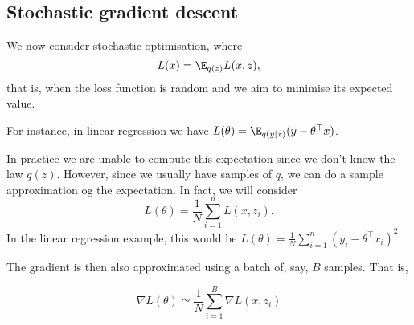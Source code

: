 \subsection{Stochastic gradient descent}
\label{sub:SGD}


We now consider stochastic optimisation, where
\begin{equation}
	L(x) = \E_{q(z)}L(x,z),
\end{equation}
that is, when the loss function is random and we aim to minimise its expected value. 

For instance, in linear regression we have $L(\theta)=\E_{q(y|x)}(y-\theta^\top x)$.

In practice we are unable to compute this expectation since we don't know the law $q(z)$. However, since we usually have samples of $q$, we can do a sample approximation og the expectation. In fact, we will consider
\begin{equation}
	L(\theta) = \frac{1}{N}\sum_{i=1}^nL(x,z_i).
\end{equation}
In the linear regression example, this would be $L(\theta) = \frac{1}{N}\sum_{i=1}^n(y_i-\theta^\top x_i)^2.$ 

The gradient is then also approximated using a batch of, say, $B$ samples. That is, 

\begin{equation}
	\nabla L(\theta)\simeq \frac{1}{N}\sum_{i=1}^B\nabla L(x,z_i)
\end{equation}

\begin{mdframed}[style=ejemplo, frametitle={\center Example: random loss function for linear regression}]


\end{mdframed}



